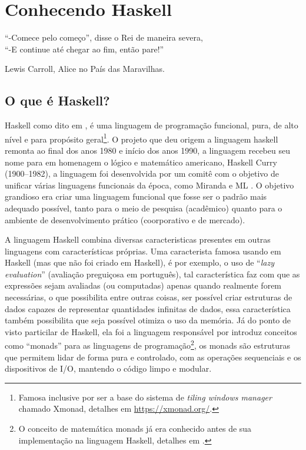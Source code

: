 \chapter{Conhecendo Haskell}\label{cap:IntroHaskell}

\epigraph{``-Comece pelo começo'', disse o Rei de maneira severa,\\ ``-E continue até chegar ao fim, então pare!''}{Lewis Carroll, Alice no País das Maravilhas.}

\section{O que é Haskell?}\label{sec:SobreHaskell}


Haskell como dito em \cite{learnHaskell2011}, é uma linguagem de programação funcional, pura, de alto nível e para propósito geral\footnote{Famosa inclusive por ser a base do sistema de \textit{tiling windows manager} chamado Xmonad, detalhes em \url{https://xmonad.org/}.}. O projeto que deu origem a linguagem haskell remonta ao final dos anos 1980 e início dos anos 1990, a linguagem recebeu seu nome para em homenagem o lógico e matemático americano, Haskell Curry (1900--1982), a linguagem foi desenvolvida por um comitê com o objetivo de unificar várias linguagens funcionais da época, como Miranda e ML \cite{haskell-history}. O objetivo grandioso era criar uma linguagem funcional que fosse ser o padrão mais adequado possível, tanto para o meio de pesquisa (acadêmico) quanto para o ambiente de desenvolvimento prático (coorporativo e de mercado).

A linguagem Haskell combina diversas caracteristicas presentes em outras linguagens com características próprias. Uma caracterista famosa usando em Haskell (mas que não foi criado em Haskell), é por exemplo, o uso de ``\textit{lazy evaluation}'' (avaliação preguiçosa em português), tal característica faz com que as expressões sejam avaliadas (ou computadas) apenas quando realmente forem necessárias, o que possibilita entre outras coisas, ser possível criar estruturas de dados capazes de representar quantidades infinitas de dados, essa característica também possibilita que seja possível otimiza o uso da memória. Já do ponto de visto particilar de Haskell, ela foi a linguagem responsável por introduz conceitos como ``monads'' para as linguagens de programação\footnote{O conceito de matemática monads já era conhecido antes de sua implementação na linguagem Haskell, detalhes em \cite{beginningHaskell}.}, os monads são estruturas que permitem lidar de forma pura e controlado, com as operações sequenciais e os dispositivos de I/O, mantendo o código limpo e modular.

